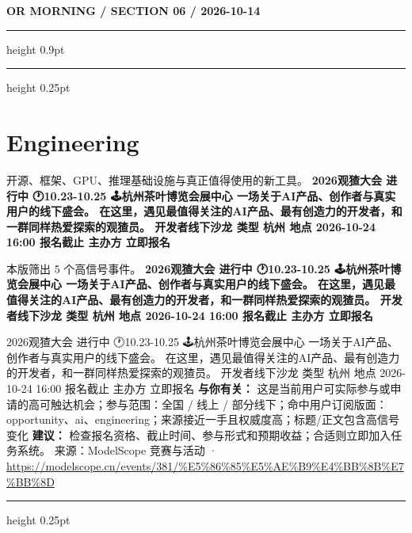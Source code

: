 \documentclass[10.5pt]{ctexart}
\begin{document}
\newpage
{\small\bfseries OR MORNING / SECTION 06 / 2026-10-14}
\vspace{2mm}
\hrule height 0.9pt
\vspace{1.5mm}
\hrule height 0.25pt
\vspace{4mm}
\section*{Engineering}
{\color{ormuted} 开源、框架、GPU、推理基础设施与真正值得使用的新工具。}
\vspace{2mm}
{\LARGE\bfseries 2026观猹大会 进行中 🕐10.23-10.25 🕹️杭州茶叶博览会展中心 一场关于AI产品、创作者与真实用户的线下盛会。 在这里，遇见最值得关注的AI产品、最有创造力的开发者，和一群同样热爱探索的观猹员。 开发者线下沙龙 类型 杭州 地点 2026-10-24 16:00 报名截止 主办方 立即报名}\par
\vspace{1mm}
{\color{ormuted} 本版筛出 5 个高信号事件。}
\vspace{3mm}
{\Large\bfseries 2026观猹大会 进行中 🕐10.23-10.25 🕹️杭州茶叶博览会展中心 一场关于AI产品、创作者与真实用户的线下盛会。 在这里，遇见最值得关注的AI产品、最有创造力的开发者，和一群同样热爱探索的观猹员。 开发者线下沙龙 类型 杭州 地点 2026-10-24 16:00 报名截止 主办方 立即报名}\par
2026观猹大会 进行中 🕐10.23-10.25 🕹️杭州茶叶博览会展中心 一场关于AI产品、创作者与真实用户的线下盛会。 在这里，遇见最值得关注的AI产品、最有创造力的开发者，和一群同样热爱探索的观猹员。 开发者线下沙龙 类型 杭州 地点 2026-10-24 16:00 报名截止 主办方 立即报名
\textbf{与你有关：} 这是当前用户可实际参与或申请的高可触达机会；参与范围：全国 / 线上 / 部分线下；命中用户订阅版面：opportunity、ai、engineering；来源接近一手且权威度高；标题/正文包含高信号变化
\textbf{建议：} 检查报名资格、截止时间、参与形式和预期收益；合适则立即加入任务系统。
{\footnotesize\color{ormuted} 来源：ModelScope 竞赛与活动 · \url{https://modelscope.cn/events/381/%E5%86%85%E5%AE%B9%E4%BB%8B%E7%BB%8D}}
\vspace{4mm}
\hrule height 0.25pt
\vspace{3mm}
\end{document}
